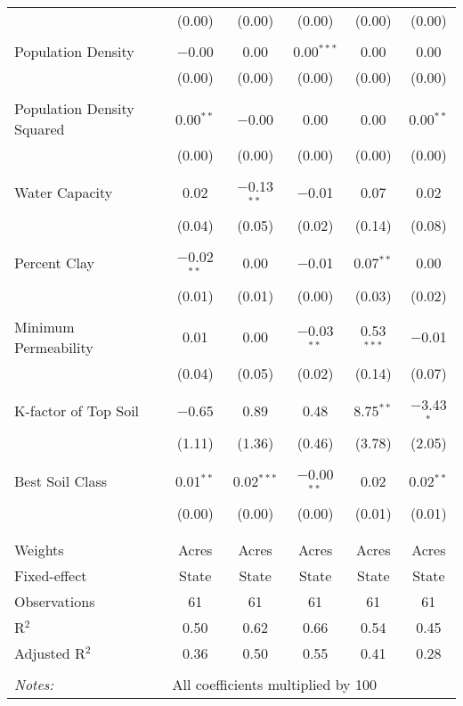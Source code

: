 \documentclass[10pt]{article}
\begin{document}
\begin{table}[!htbp]
\begin{tabular}{@{\extracolsep{5pt}}lccccc}
  & (0.00) & (0.00) & (0.00) & (0.00) & (0.00) \\ 
  & & & & & \\ 
 Population Density & $-$0.00 & 0.00 & 0.00$^{***}$ & 0.00 & 0.00 \\ 
  & (0.00) & (0.00) & (0.00) & (0.00) & (0.00) \\ 
  & & & & & \\ 
 Population Density Squared & 0.00$^{**}$ & $-$0.00 & 0.00 & 0.00 & 0.00$^{**}$ \\ 
  & (0.00) & (0.00) & (0.00) & (0.00) & (0.00) \\ 
  & & & & & \\ 
 Water Capacity & 0.02 & $-$0.13$^{**}$ & $-$0.01 & 0.07 & 0.02 \\ 
  & (0.04) & (0.05) & (0.02) & (0.14) & (0.08) \\ 
  & & & & & \\ 
 Percent Clay & $-$0.02$^{**}$ & 0.00 & $-$0.01 & 0.07$^{**}$ & 0.00 \\ 
  & (0.01) & (0.01) & (0.00) & (0.03) & (0.02) \\ 
  & & & & & \\ 
 Minimum Permeability & 0.01 & 0.00 & $-$0.03$^{**}$ & 0.53$^{***}$ & $-$0.01 \\ 
  & (0.04) & (0.05) & (0.02) & (0.14) & (0.07) \\ 
  & & & & & \\ 
 K-factor of Top Soil & $-$0.65 & 0.89 & 0.48 & 8.75$^{**}$ & $-$3.43$^{*}$ \\ 
  & (1.11) & (1.36) & (0.46) & (3.78) & (2.05) \\ 
  & & & & & \\ 
 Best Soil Class & 0.01$^{**}$ & 0.02$^{***}$ & $-$0.00$^{**}$ & 0.02 & 0.02$^{**}$ \\ 
  & (0.00) & (0.00) & (0.00) & (0.01) & (0.01) \\ 
  & & & & & \\ 
\hline \\[-1.8ex] 
Weights & Acres & Acres & Acres & Acres & Acres \\ 
Fixed-effect & State & State & State & State & State \\ 
Observations & 61 & 61 & 61 & 61 & 61 \\ 
R$^{2}$ & 0.50 & 0.62 & 0.66 & 0.54 & 0.45 \\ 
Adjusted R$^{2}$ & 0.36 & 0.50 & 0.55 & 0.41 & 0.28 \\ 
\hline 
\hline \\[-1.8ex] 
\textit{Notes:} & \multicolumn{5}{l}{All coefficients multiplied by 100} \\ 
\end{tabular} 
\end{table} 
\end{document}
